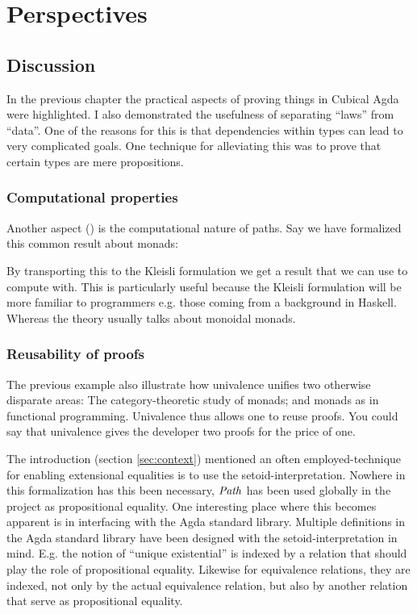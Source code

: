 \chapter{Perspectives}
\section{Discussion}
In the previous chapter the practical aspects of proving things in Cubical Agda
were highlighted. I also demonstrated the usefulness of separating ``laws'' from
``data''. One of the reasons for this is that dependencies within types can lead
to very complicated goals. One technique for alleviating this was to prove that
certain types are mere propositions.

\subsection{Computational properties}
Another aspect () is the computational nature of paths. Say we have formalized this
common result about monads:


By transporting this to the Kleisli formulation we get a result that we can use
to compute with. This is particularly useful because the Kleisli formulation
will be more familiar to programmers e.g. those coming from a background in
Haskell. Whereas the theory usually talks about monoidal monads.


\subsection{Reusability of proofs}
The previous example also illustrate how univalence unifies two otherwise
disparate areas: The category-theoretic study of monads; and monads as in
functional programming. Univalence thus allows one to reuse proofs. You could
say that univalence gives the developer two proofs for the price of one.

The introduction (section \ref{sec:context}) mentioned an often
employed-technique for enabling extensional equalities is to use the
setoid-interpretation. Nowhere in this formalization has this been necessary,
$\mathit{Path}$ has been used globally in the project as propositional equality. One
interesting place where this becomes apparent is in interfacing with the Agda
standard library. Multiple definitions in the Agda standard library have been
designed with the setoid-interpretation in mind. E.g. the notion of ``unique
existential'' is indexed by a relation that should play the role of
propositional equality. Likewise for equivalence relations, they are indexed,
not only by the actual equivalence relation, but also by another relation that
serve as propositional equality.

